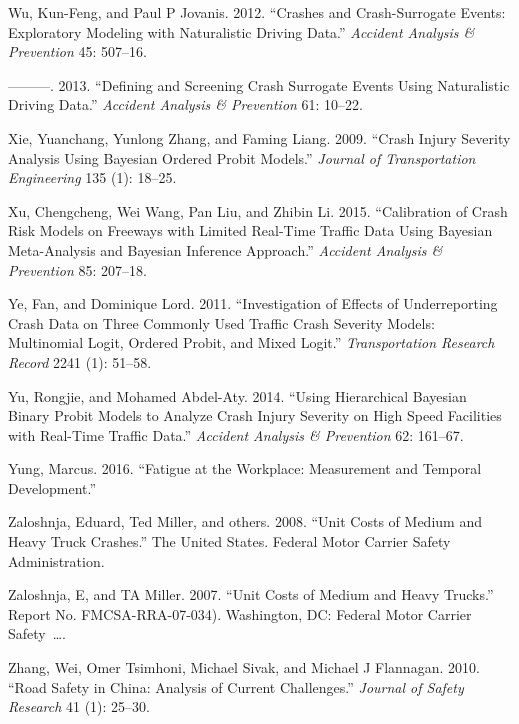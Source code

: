 \documentclass[12pt]{book}
\numberwithin{equation}{chapter}
\begin{document}
\leavevmode\hypertarget{ref-wu2012crashes}{}%
Wu, Kun-Feng, and Paul P Jovanis. 2012. ``Crashes and Crash-Surrogate Events: Exploratory Modeling with Naturalistic Driving Data.'' \emph{Accident Analysis \& Prevention} 45: 507--16.

\leavevmode\hypertarget{ref-wu2013defining}{}%
---------. 2013. ``Defining and Screening Crash Surrogate Events Using Naturalistic Driving Data.'' \emph{Accident Analysis \& Prevention} 61: 10--22.

\leavevmode\hypertarget{ref-xie2009crash}{}%
Xie, Yuanchang, Yunlong Zhang, and Faming Liang. 2009. ``Crash Injury Severity Analysis Using Bayesian Ordered Probit Models.'' \emph{Journal of Transportation Engineering} 135 (1): 18--25.

\leavevmode\hypertarget{ref-xu2015calibration}{}%
Xu, Chengcheng, Wei Wang, Pan Liu, and Zhibin Li. 2015. ``Calibration of Crash Risk Models on Freeways with Limited Real-Time Traffic Data Using Bayesian Meta-Analysis and Bayesian Inference Approach.'' \emph{Accident Analysis \& Prevention} 85: 207--18.

\leavevmode\hypertarget{ref-ye2011investigation}{}%
Ye, Fan, and Dominique Lord. 2011. ``Investigation of Effects of Underreporting Crash Data on Three Commonly Used Traffic Crash Severity Models: Multinomial Logit, Ordered Probit, and Mixed Logit.'' \emph{Transportation Research Record} 2241 (1): 51--58.

\leavevmode\hypertarget{ref-yu2014using}{}%
Yu, Rongjie, and Mohamed Abdel-Aty. 2014. ``Using Hierarchical Bayesian Binary Probit Models to Analyze Crash Injury Severity on High Speed Facilities with Real-Time Traffic Data.'' \emph{Accident Analysis \& Prevention} 62: 161--67.

\leavevmode\hypertarget{ref-yung2016fatigue}{}%
Yung, Marcus. 2016. ``Fatigue at the Workplace: Measurement and Temporal Development.''

\leavevmode\hypertarget{ref-zaloshnja2008unit}{}%
Zaloshnja, Eduard, Ted Miller, and others. 2008. ``Unit Costs of Medium and Heavy Truck Crashes.'' The United States. Federal Motor Carrier Safety Administration.

\leavevmode\hypertarget{ref-zaloshnja2007unit}{}%
Zaloshnja, E, and TA Miller. 2007. ``Unit Costs of Medium and Heavy Trucks.'' Report No. FMCSA-RRA-07-034). Washington, DC: Federal Motor Carrier Safety~\ldots{}.

\leavevmode\hypertarget{ref-zhang2010road}{}%
Zhang, Wei, Omer Tsimhoni, Michael Sivak, and Michael J Flannagan. 2010. ``Road Safety in China: Analysis of Current Challenges.'' \emph{Journal of Safety Research} 41 (1): 25--30.
\end{document}
